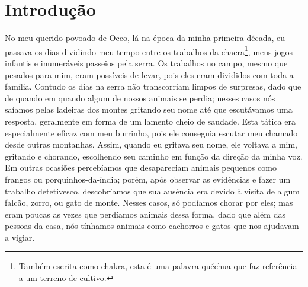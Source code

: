 \cleardoublepage
\newpage
{}
\chapter*{Introdução} %

No meu querido povoado de Occo, lá na época da minha primeira década, eu passava os dias dividindo meu tempo entre os trabalhos da chacra\footnote{Também escrita como chakra, esta é uma palavra quéchua que faz referência a um terreno de cultivo.}, meus jogos infantis e inumeráveis passeios pela serra.
Os trabalhos no campo, mesmo que pesados para mim, eram possíveis de levar, pois eles eram divididos com toda a família.
Contudo os dias na serra não transcorriam limpos de surpresas, dado que de quando em quando algum de nossos animais se perdia; nesses casos nós saíamos pelas ladeiras dos montes gritando seu nome até que escutávamos uma resposta, geralmente em forma de um lamento cheio de saudade.
Esta tática era especialmente eficaz com meu burrinho, pois ele conseguia escutar meu chamado desde outras montanhas. Assim, quando eu gritava seu nome, ele voltava a mim, gritando e chorando, escolhendo seu caminho em função da direção da minha voz.
Em outras ocasiões percebíamos que desapareciam animais pequenos como frangos ou porquinhos-da-índia; porém, após observar as evidências e fazer um trabalho detetivesco, descobríamos que sua ausência era devido à visita de algum falcão, zorro, ou gato de monte.
Nesses casos, só podíamos chorar por eles; mas eram poucas as vezes que perdíamos animais dessa forma, dado que além das pessoas da casa, nós tínhamos animais como cachorros e gatos que nos ajudavam a vigiar.

